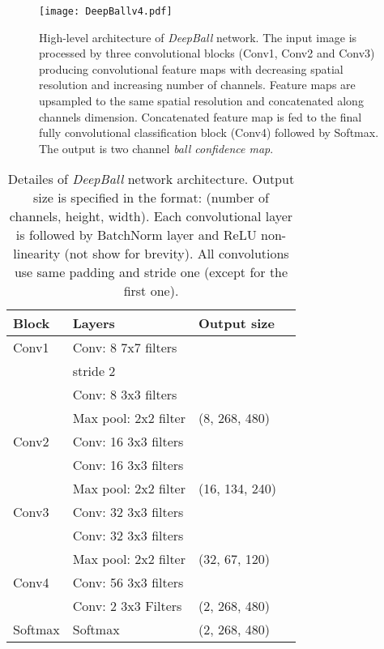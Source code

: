 \documentclass[a4paper,twoside]{article}
\begin{document}
\begin{figure*}
 \centering
  \texttt{[image: DeepBallv4.pdf]}
    \caption{High-level architecture of \emph{DeepBall} network.
    The input image is processed by three convolutional blocks (Conv1, Conv2 and Conv3) producing convolutional feature maps with decreasing spatial resolution and increasing number of channels.
    Feature maps are upsampled to the same spatial resolution and concatenated along channels dimension. Concatenated feature map is fed to the final fully convolutional classification block (Conv4) followed by Softmax. The output is two channel \emph{ball confidence map}.
    }
  \label{jk:fig:network-diagram}
\end{figure*}

\begin{table}[ht]
\caption{Detailes of \emph{DeepBall} network architecture. Output size is specified in the format: (number of channels, height, width).
Each convolutional layer is followed by BatchNorm layer and ReLU non-linearity (not show for brevity).
All convolutions use same padding and stride one (except for the first one).
}
\begin{center}
\begin{tabular}{l@{\quad}l@{\quad}l@{\quad}l}
\hline
Block & Layers & Output size \\
 \hline
Conv1  &  Conv: 8 7x7 filters &  \\
       &                  stride 2 & \\
       & Conv: 8 3x3 filters &  \\
       & Max pool: 2x2 filter & (8, 268, 480)\\
Conv2  &  Conv: 16 3x3 filters    &   \\
       & Conv: 16 3x3 filters &  \\
       & Max pool: 2x2 filter  & (16, 134, 240)\\
Conv3  &  Conv: 32 3x3 filters   &   \\
       & Conv: 32 3x3 filters & \\
       & Max pool: 2x2 filter  & (32, 67, 120)\\
Conv4   &  Conv: 56 3x3 filters    &  \\
        &  Conv: 2 3x3 Filters    &  (2, 268, 480) \\
Softmax &  Softmax & (2, 268, 480) \\
[2pt]
\hline
\end{tabular}
\end{center}
\label{jk:table2}
\end{table}
\end{document}
